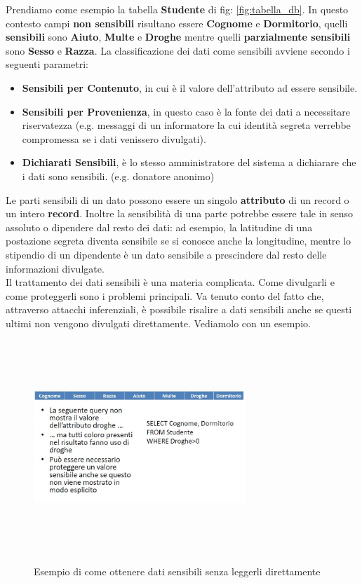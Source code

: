 Prendiamo come esempio la tabella \textbf{Studente} di fig: \ref{fig:tabella_db}. In questo contesto campi \textbf{non sensibili} risultano essere \textbf{Cognome} e \textbf{Dormitorio}, quelli \textbf{sensibili} sono \textbf{Aiuto}, \textbf{Multe} e \textbf{Droghe} mentre quelli \textbf{parzialmente sensibili} sono \textbf{Sesso} e \textbf{Razza}. La classificazione dei dati come sensibili avviene secondo i seguenti parametri:

\begin{itemize}
	\item \textbf{Sensibili per Contenuto}, in cui è il valore dell'attributo ad essere sensibile.
	\item \textbf{Sensibili per Provenienza}, in questo caso è la fonte dei dati a necessitare riservatezza (e.g. messaggi di un informatore la cui identità segreta verrebbe compromessa se i dati venissero divulgati).
	\item \textbf{Dichiarati Sensibili}, è lo stesso amministratore del sistema a dichiarare che i dati sono sensibili. (e.g.  donatore anonimo)
\end{itemize}

Le parti sensibili di un dato possono essere un singolo \textbf{attributo} di un record o un intero \textbf{record}. Inoltre la sensibilità di una parte potrebbe essere tale in senso assoluto o dipendere dal resto dei dati: ad esempio, la latitudine di una postazione segreta diventa sensibile se si conosce anche la longitudine, mentre lo stipendio di un dipendente è un dato sensibile a prescindere dal resto delle informazioni divulgate. \\

Il trattamento dei dati sensibili è una materia complicata. Come divulgarli e come proteggerli sono i problemi principali. Va tenuto conto del fatto che, attraverso attacchi inferenziali, è possibile risalire a dati sensibili anche se questi ultimi non vengono divulgati direttamente. Vediamolo con un esempio.
\begin{figure}[htbp]
	\centering
		{\includegraphics[height=8cm, width=8cm, keepaspectratio]{Immagini/Appendice1/prot_dati_02.JPG}}
			\caption{Esempio di come ottenere dati sensibili senza leggerli direttamente \label{fig:query_db}}
\end{figure}

